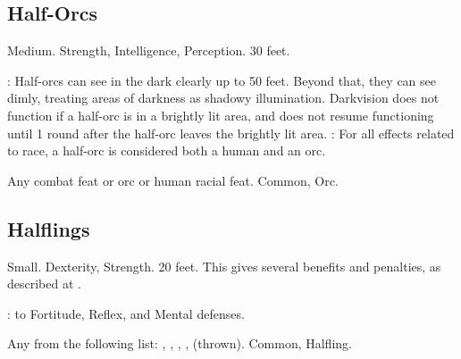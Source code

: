 \subsection{Half-Orcs}
 Medium.
  Strength,  Intelligence,  Perception.
 30 feet.
\begin{itemize}
    : Half-orcs can see in the dark clearly up to 50 feet.   Beyond that, they can see dimly, treating areas of darkness as shadowy illumination. Darkvision does not function if a half-orc is in a brightly lit area, and does not resume functioning until 1 round after the half-orc leaves the brightly lit area.
    : For all effects related to race, a half-orc is considered both a human and an orc.
\end{itemize}
 Any combat feat or orc or human racial feat.
 Common, Orc.

\subsection{Halflings}
 Small.
  Dexterity,  Strength.
 20 feet. This gives several benefits and penalties, as described at .
\begin{itemize}
    :  to Fortitude, Reflex, and Mental defenses.
\end{itemize}
 Any from the following list: , , , ,  (thrown).
 Common, Halfling.
